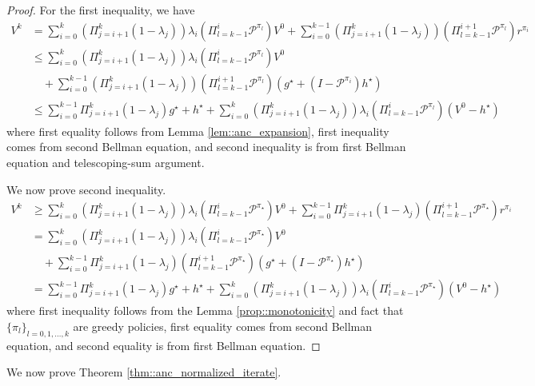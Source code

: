 \documentclass{article} %
\newcommand{\cP}{\mathcal{P}}
\newcommand*{\para}[1]{\left({#1}\right)}
\begin{document}
\begin{proof}
    For the first inequality, we have
    \begin{align*}
        V^k &= \sum_{i=0}^{k} (\Pi^k_{j=i+1} (1-\lambda_j)) \lambda_{i}\para{\Pi^{i}_{l=k-1}\cP^{\pi_l}}V^0+\sum_{i=0}^{k-1} \para{\Pi^k_{j=i+1} (1-\lambda_j)} \para{\Pi^{i+1}_{l=k-1}\cP^{\pi_l}}r^{\pi_{i}}\\
        &\le  \sum_{i=0}^{k} (\Pi^k_{j=i+1} (1-\lambda_j)) \lambda_{i}\para{\Pi^{i}_{l=k-1}\cP^{\pi_l}}V^0 \\& \quad +\sum_{i=0}^{k-1} \para{\Pi^k_{j=i+1} (1-\lambda_j)} \para{\Pi^{i+1}_{l=k-1}\cP^{\pi_l}}(g^{\star}+(I-\cP^{\pi_i})h^{\star})\\
        &\le \sum_{i=0}^{k-1} \Pi^k_{j=i+1} (1-\lambda_j)g^{\star}+h^{\star}+\sum_{i=0}^{k} (\Pi^k_{j=i+1} (1-\lambda_j)) \lambda_{i}\para{\Pi^{i}_{l=k-1}\cP^{\pi_l}}(V^0-h^{\star})
    \end{align*}
        where first equality follows from Lemma \ref{lem::anc_expansion}, first inequality comes from second Bellman equation, and second inequality is from first Bellman equation and telescoping-sum argument.
        
We now prove second inequality.
    \begin{align*}
        V^k & \ge \sum_{i=0}^{k} (\Pi^k_{j=i+1} (1-\lambda_j)) \lambda_{i}\para{\Pi^{i}_{l=k-1}\cP^{\pi_{\star}}}V^0+\sum_{i=0}^{k-1} \Pi^k_{j=i+1} (1-\lambda_j) \para{\Pi^{i+1}_{l=k-1}\cP^{\pi_{\star}}}r^{\pi_{i}}
        \\& =  \sum_{i=0}^{k} (\Pi^k_{j=i+1} (1-\lambda_j)) \lambda_{i}\para{\Pi^{i}_{l=k-1}\cP^{\pi_{\star}}}V^0
        \\& \quad +\sum_{i=0}^{k-1} \Pi^k_{j=i+1} (1-\lambda_j) \para{\Pi^{i+1}_{l=k-1}\cP^{\pi_{\star}}}\para{g^{\star}+(I-\cP^{\pi_{\star}})h^{\star}}
        \\& = \sum_{i=0}^{k-1} \Pi^k_{j=i+1} (1-\lambda_j)g^{\star}+h^{\star}+ \sum_{i=0}^{k} (\Pi^k_{j=i+1} (1-\lambda_j)) \lambda_{i}\para{\Pi^{i}_{l=k-1}\cP^{\pi_{\star}}}(V^0-h^{\star})
    \end{align*}
    where first inequality follows from the Lemma \ref{prop::monotonicity} and fact that $\{\pi_l\}_{l=0,1,\dots,k}$ are greedy policies, first equality comes from second Bellman equation, and second equality is from first Bellman equation. 
\end{proof}

We now prove Theorem \ref{thm::anc_normalized_iterate}.
\end{document}
